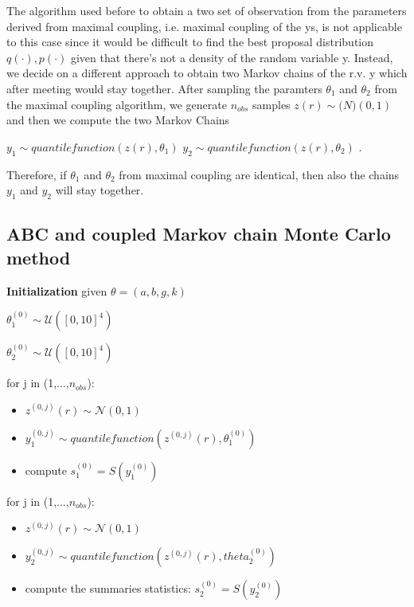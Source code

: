 \documentclass{article}
\begin{document}
The algorithm used before to obtain a two set of observation from the parameters derived from maximal coupling, i.e. maximal coupling of the ys, is not applicable to this case since it would be difficult to find the best proposal distribution $q(\cdot),p(\cdot)$ given that there's not a density of the random variable y.
Instead, we decide on a different approach to obtain two Markov chains of the r.v. y which after meeting would stay together.
After sampling the paramters $\theta_{1} $ and $ \theta_{2}$ from the maximal coupling algorithm, we generate $n_{obs}$ samples $z(r) \sim \mathcal(N)(0,1)$
and then we compute the two Markov Chains

$ y_{1} \sim quantile function(z(r), \theta_{1})$
$ y_{2} \sim quantile function(z(r),\theta_{2})$ .

Therefore, if $\theta_{1}  $ and $  \theta_{2}$ from maximal coupling are identical, then also the chains $y_{1} $ and $  y_{2}$ will stay together.


\subsection{ABC and coupled Markov chain Monte Carlo method}
\textbf{Initialization}
	given $\theta =( a,b,g,k )$

$ \theta_{1}^{(0)} \sim \mathcal{U}([0,10]^4)$

$ \theta_{2}^{(0)} \sim \mathcal{U}([0,10]^4)$

for j in (1,...,$n_{obs}$):
\begin{itemize}
	\item $z^{(0,j)}(r) \sim \mathcal{N}(0,1)  $
	
	\item $ y_{1}^{(0,j)} \sim quantilefunction(z^{(0,j)}(r),\theta_{1}^{(0)})$
	
	\item compute $ s_{1}^{(0)} =S(y_{1}^{(0)})$
\end{itemize}
for j in (1,...,$n_{obs}$):

\begin{itemize}
	\item $z^{(0,j)}(r) \sim \mathcal{N}(0,1)  $
	
	\item $ y_{2}^{(0,j)} \sim quantile function(z^{(0,j)}(r),theta_{2}^{(0)})$
	
	\item compute the summaries statistics:
	$ s_{2}^{(0)} =S(y_{2}^{(0)})$
\end{itemize}
\end{document}
